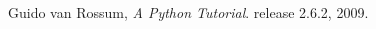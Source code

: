   \begin{thebibliography}{9}
   
    Guido van Rossum,
    \emph{A Python Tutorial}.
    release 2.6.2,
    2009.
   
  \end{thebibliography}